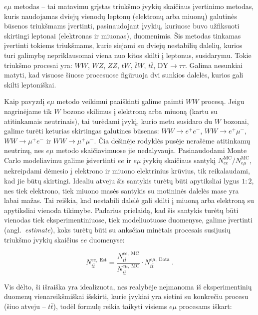 \documentclass[a4paper, 12pt]{article}
\newcommand{\WW}{W\! W}
\newcommand{\ZZ}{Z\! Z}
\newcommand{\WZ}{W\! Z}
\newcommand{\tbarW}{\bar{t}W}
\newcommand{\ttbar}{t\bar{t}}
\newcommand{\emu}{e\mu}
\newcommand{\DYtau}{\mathrm{DY} \! \rightarrow \! \tau\tau}
\newlength\q
\begin{document}
$\emu$ metodas -- tai matavimu grįstas triukšmo įvykių skaičiaus įvertinimo metodas, kuris
naudojamas dviejų vienodų leptonų (elektronų arba miuonų) galutinės būsenos triukšmams
įvertinti, pasinaudojant įvykių, kuriuose buvo užfiksuoti skirtingi leptonai (elektronas
ir miuonas), duomenimis.
Šis metodas tinkamas įvertinti tokiems triukšmams, kurie siejami su dviejų nestabilių
dalelių, kurios turi galimybę nepriklausomai viena nuo kitos skilti į leptonus, susidarymu.
Tokie triukšmo procesai yra: $\WW$, $\WZ$, $\ZZ$, $tW$, $\tbarW$, $\ttbar$, $\DYtau$.
Galima nesunkiai matyti, kad visuose šiuose procesuose figūruoja dvi sunkios dalelės, kurios
gali skilti leptoniškai.

Kaip pavyzdį $\emu$ metodo veikimui paaiškinti galime paimti $WW$ procesą.
Jeigu nagrinėjame tik $W$ bozono skilimus į elektroną arba miuoną (kartu su atitinkamais
neutrinais), tai turėdami įvykį, kurio metu susidaro du $W$ bozonai, galime turėti
keturias skirtingas galutines būsenas: $WW \! \rightarrow \! e^+e^-$,
$WW \! \rightarrow \! e^+\mu^-$, $WW \! \rightarrow \! \mu^+e^-$ ir
$WW \! \rightarrow \! \mu^+\mu^-$.
Čia dešinėje rodyklės pusėje nerašėme atitinkamų neutrinų, nes $\emu$ metodo skaičiavimuose
jie nedalyvauja.
Pasinaudodami Monte Carlo modeliavimu galime įsivertinti $ee$ ir $\emu$ įvykių skaičiaus
santykį $N_{ee}^{\mathrm{MC}} / N_{\emu}^{\mathrm{MC}}$, nekreipdami dėmesio į elektrono
ir miuono elektrinius krūvius, tik reikalaudami, kad jie būtų skirtingi.
Idealiu atveju šis santykis turėtų būti apytiksliai lygus $1:2$, nes tiek elektrono, tiek
miuono masės santykis su motininės dalelės mase yra labai mažas.
Tai reiškia, kad nestabili dalelė gali skilti į miuoną arba elektroną su apytiksliai
vienoda tikimybe.
Padarius prielaidą, kad šis santykis turėtų būti vienodas tiek eksperimentiniuose, tiek
modeliuotuose duomenyse, galime įvertinti (angl.\ \textit{estimate}), koks turėtų būti su
anksčiau minėtais procesais susijusių triukšmo įvykių skaičius $ee$ duomenyse:

\begin{equation}
	N_{t\bar{t}}^{ee , \; \mathrm{Est}} =
	\frac{ N_{t\bar{t}}^{ee , \; \mathrm{MC}} }{ N_{t\bar{t}}^{e\mu , \; \mathrm{MC}} }
	\cdot N_{t\bar{t}}^{e\mu , \; \mathrm{Data}} \; .
	\label{eq:emuMethod}
\end{equation}

Vis dėlto, ši išraiška yra idealizuota, nes realybėje neįmanoma iš eksperimentinių duomenų
vienareikšmiškai išskirti, kurie įvykiai yra sietini su konkrečiu procesu (šiuo atveju --
$\ttbar$), todėl formulę reikia taikyti visiems $\emu$ procesams iškart:
\end{document}
